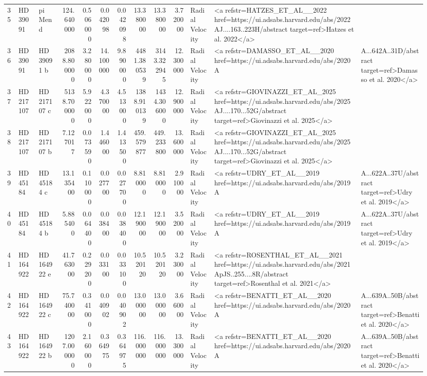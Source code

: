 \begin{tabular}{lllrrrrrrrll}
35 & HD 39091 & pi Men d & 124.640000 & 0.506000 & 0.042098 & 0.042098 & 13.380000 & 13.380000 & 3.720000 & Radial Velocity & <a refstr=HATZES_ET_AL__2022 href=https://ui.adsabs.harvard.edu/abs/2022AJ....163..223H/abstract target=ref>Hatzes et al. 2022</a> \\
36 & HD 39091 & HD 39091 b & 2088.800000 & 3.280000 & 14.100000 & 9.890000 & 4481.380539 & 3143.322945 & 12.300000 & Radial Velocity & <a refstr=DAMASSO_ET_AL__2020 href=https://ui.adsabs.harvard.edu/abs/2020A&A...642A..31D/abstract target=ref>Damasso et al. 2020</a> \\
37 & HD 217107 & HD 217107 c & 5138.700000 & 5.922000 & 4.370000 & 4.513000 & 1388.910139 & 1434.306000 & 12.900000 & Radial Velocity & <a refstr=GIOVINAZZI_ET_AL_2025 href=https://ui.adsabs.harvard.edu/abs/2025AJ....170...52G/abstract target=ref>Giovinazzi et al. 2025</a> \\
38 & HD 217107 & HD 217107 b & 7.127017 & 0.073590 & 1.446000 & 1.413500 & 459.579877 & 449.233800 & 13.600000 & Radial Velocity & <a refstr=GIOVINAZZI_ET_AL_2025 href=https://ui.adsabs.harvard.edu/abs/2025AJ....170...52G/abstract target=ref>Giovinazzi et al. 2025</a> \\
39 & HD 45184 & HD 45184 c & 13.135400 & 0.110000 & 0.027700 & 0.027700 & 8.810000 & 8.810000 & 2.910000 & Radial Velocity & <a refstr=UDRY_ET_AL__2019 href=https://ui.adsabs.harvard.edu/abs/2019A&A...622A..37U/abstract target=ref>Udry et al. 2019</a> \\
40 & HD 45184 & HD 45184 b & 5.885400 & 0.064400 & 0.038400 & 0.038400 & 12.190000 & 12.190000 & 3.520000 & Radial Velocity & <a refstr=UDRY_ET_AL__2019 href=https://ui.adsabs.harvard.edu/abs/2019A&A...622A..37U/abstract target=ref>Udry et al. 2019</a> \\
41 & HD 164922 & HD 164922 e & 41.763000 & 0.229200 & 0.033100 & 0.033100 & 10.520120 & 10.520120 & 3.230000 & Radial Velocity & <a refstr=ROSENTHAL_ET_AL__2021 href=https://ui.adsabs.harvard.edu/abs/2021ApJS..255....8R/abstract target=ref>Rosenthal et al. 2021</a> \\
42 & HD 164922 & HD 164922 c & 75.740000 & 0.341000 & 0.040902 & 0.040902 & 13.000000 & 13.000000 & 3.660000 & Radial Velocity & <a refstr=BENATTI_ET_AL__2020 href=https://ui.adsabs.harvard.edu/abs/2020A&A...639A..50B/abstract target=ref>Benatti et al. 2020</a> \\
43 & HD 164922 & HD 164922 b & 1207.000000 & 2.160000 & 0.364975 & 0.364975 & 116.000000 & 116.000000 & 13.300000 & Radial Velocity & <a refstr=BENATTI_ET_AL__2020 href=https://ui.adsabs.harvard.edu/abs/2020A&A...639A..50B/abstract target=ref>Benatti et al. 2020</a> \\

\end{tabular}
